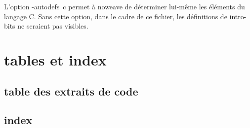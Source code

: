 \documentclass{scrartcl}%
\begin{document}
%
%
%
%
%
%
%
%
%
%
%
%
\nwdocspar
L'option {\Tt{}-autodefs\ c\nwendquote} permet à {\Tt{}noweave\nwendquote} de déterminer lui-même les éléments du langage C. Sans cette option, dans le cadre de ce fichier, les définitions de {\Tt{}intro-bits\nwendquote} ne seraient pas visibles.

\section{tables et index}
\subsection{table des extraits de code}

\begin{multicols}{2}
\nowebchunks
\end{multicols}

\subsection{index}

\begin{multicols}{2}
\nowebindex
\end{multicols}
\end{document}
